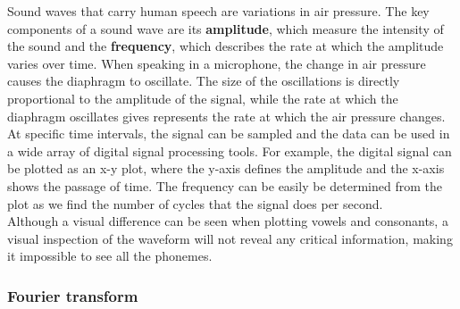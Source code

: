 Sound waves that carry human speech are variations in air pressure. The key components of a sound wave are its \textbf{amplitude}, which measure the intensity of the sound and the \textbf{frequency}, which describes the rate at which the amplitude varies over time. When speaking in a microphone, the change in air pressure causes the diaphragm to oscillate. The size of the oscillations is directly proportional to the amplitude of the signal, while the rate at which the diaphragm oscillates gives represents the rate at which the air pressure changes. At specific time intervals, the signal can be sampled and the data can be used in a wide array of digital signal processing tools. For example, the digital signal can be plotted as an x-y plot, where the y-axis defines the amplitude and the x-axis shows the passage of time. The frequency can be easily be determined from the plot as we find the number of cycles that the signal does per second.\\

Although a visual difference can be seen when plotting vowels and consonants, a visual inspection of the waveform will not reveal any critical information, making it impossible to see all the phonemes.\\

\subsubsection{ Fourier transform}






